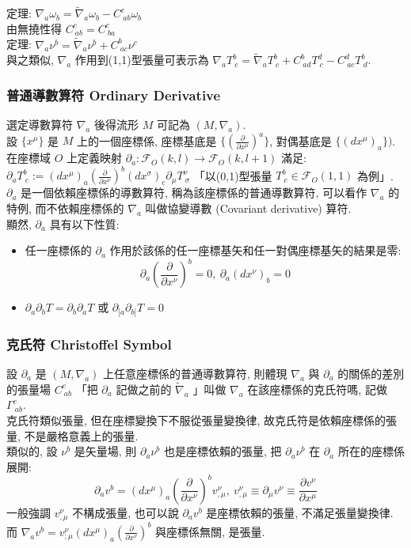 \documentclass{article}
\begin{document}
\begin{CJK}{UTF8}{bsmi}
定理: $\nabla_a\omega_b=\tilde\nabla_a\omega_b-C^c_{\ ab}\omega_b$
\\ 由無撓性得 $C^c_{\ ab}=C^c_{\ ba}$
\\

定理: $\nabla_a\nu^b=\tilde\nabla_a\nu^b+C^b_{\ ac }\nu^c$
\\ 與之類似, $\nabla_a$ 作用到(1,1)型張量可表示為 $\nabla_a T^b_{\ c}=\tilde\nabla_aT^b_{\ c}+C^b_{\ ad}T^d_{\ c}-C^d_{\ ac}T^b_{\ d}$.
\subsubsection{普通導數算符 Ordinary Derivative}
 選定導數算符 $\nabla_a$ 後得流形 $M$ 可記為 $(M,\nabla_a)$.
\\ 設 $\{ x^\mu\}$ 是 $M$ 上的一個座標係, 座標基底是 $\{ (\frac{\partial}{\partial x^\mu})^a\}$, 對偶基底是 $\{ (dx^\mu)_a\})$. 
\\ 在座標域 $O$ 上定義映射 $\partial_a: \mathscr{F}_O(k,l)\rightarrow \mathscr{F}_O(k,l+1)$ 滿足: $\partial_a T^b_{\ c}:= (dx^\mu)_a(\frac{\partial}{\partial x^\nu})^b (dx^\sigma)_c\partial_\mu T^\nu_{\ \sigma}$ 「以(0,1)型張量 $T^b_{\ c}\in \mathscr{F}_O(1,1)$ 為例」.
\\ $\partial_a$ 是一個依賴座標係的導數算符, 稱為該座標係的普通導數算符, 可以看作 $\nabla_a$ 的特例, 而不依賴座標係的 $\nabla_a$ 叫做協變導數 (Covariant derivative) 算符.
\\ 顯然, $\partial_a$ 具有以下性質:\begin{itemize}
  \item 任一座標係的 $\partial_a$ 作用於該係的任一座標基矢和任一對偶座標基矢的結果是零:$$\partial_a (\frac{\partial}{\partial x^\nu})^b=0,\ \partial_a (dx^\nu)_b=0 $$
  \item $\partial_a\partial_b T=\partial_b\partial_a T$ 或 $\partial_{[a}\partial_{b]}T=0$
\end{itemize}
\subsubsection{克氏符 Christoffel Symbol}
設 $\partial_a$ 是 $(M, \nabla_a)$ 上任意座標係的普通導數算符, 則體現 $\nabla_a$ 與 $\partial_a$ 的關係的差別的張量場 $C^c_{\ ab}$ 「把 $\partial_a$ 記做之前的 $\tilde\nabla_a$ 」叫做 $\nabla_a$ 在該座標係的克氏符嗎, 記做 $\Gamma^c_{\ ab}$.
\\ 克氏符類似張量, 但在座標變換下不服從張量變換律, 故克氏符是依賴座標係的張量, 不是嚴格意義上的張量.
\\  類似的, 設 $\nu^b$ 是矢量場, 則 $\partial_a\nu^b$ 也是座標依賴的張量, 把 $\partial_a\nu^b$ 在 $\partial_a$ 所在的座標係展開: $$\partial_a v^b=(dx^\mu)_a(\frac{\partial}{\partial x^\nu})^b v^\nu_{,\mu} , \ v^\nu_{,\mu}\equiv \partial_\mu v^\nu \equiv \frac{\partial v^\nu}{\partial x^\mu}$$ 
一般強調 $v^\nu_{,\mu}$ 不構成張量, 也可以說 $\partial_a v^b$ 是座標依賴的張量, 不滿足張量變換律. 
而 $\nabla_a v^b=v^\nu_{;\mu}(dx^\mu)_a(\frac{\partial}{\partial x^\nu})^b$ 與座標係無關, 是張量.
\\ 


\end{CJK}
\end{document}

